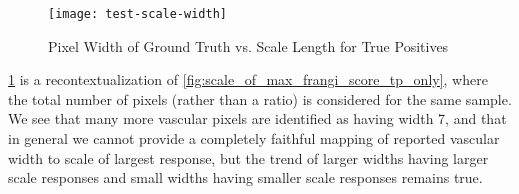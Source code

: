 \begin{figure}[p]
  \texttt{[image: test-scale-width]}
  \caption{Pixel Width of Ground Truth vs. Scale Length for True Positives}
  \label{fig:scale_for_max_frangi_score_seaborn}
\end{figure}

\cref{fig:scale_for_max_frangi_score_seaborn} is a recontextualization of \cref{fig:scale_of_max_frangi_score_tp_only}, where the total number of pixels (rather than a ratio) is considered for the same sample.
We see that many more vascular pixels are identified as having width 7, and that in general we cannot provide a completely faithful mapping of reported vascular width to scale of largest response, but the trend of larger widths having larger scale responses and small widths having smaller scale responses remains true.
